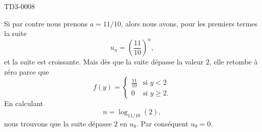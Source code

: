\begin{corrige}{TD3-0008}
\begin{enumerate}
			Si par contre nous prenons $a=11/10$, alors nous avons, pour les premiers termes la suite
			\begin{equation}
				u_n=\left( \frac{ 11 }{ 10 } \right)^n,
			\end{equation}
			et la suite est croissante. Mais dès que la suite dépasse la valeur $2$, elle retombe à zéro parce que 
			\begin{equation}
				f(y)=\begin{cases}
					\frac{ 11 }{ 10 }	&	\text{si $y<2$}\\
					0	&	 \text{si $y\geq 2$.}
				\end{cases}
			\end{equation}
			En calculant
			\begin{equation}
				n=\log_{11/10}(2),
			\end{equation}
			nous trouvons que la suite dépasse $2$ en $u_8$. Par conséquent $u_9=0$.

	\end{enumerate}

\end{corrige}
